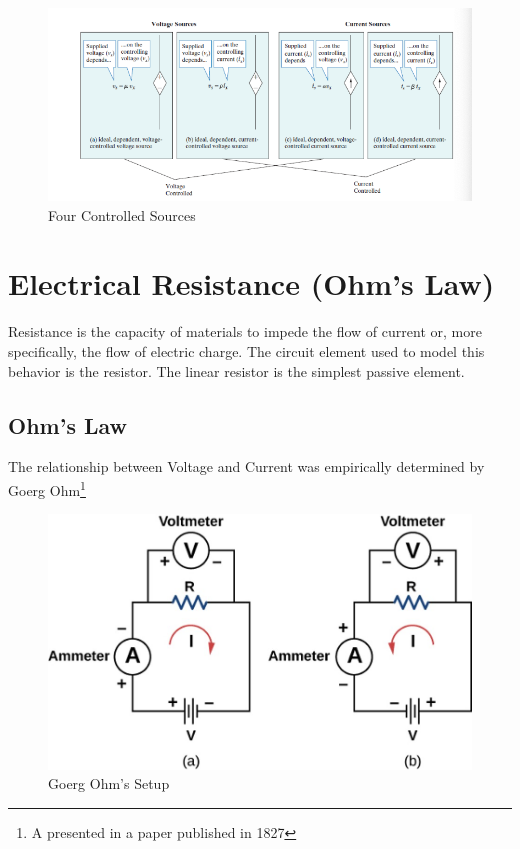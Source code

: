 \documentclass[14pt]{memoir}
\begin{document}
\begin{figure}[h]
\begin{center}
\includegraphics[scale=0.60]{fig/fig02_02.png}
\caption{Four Controlled Sources}
\label{fig:f02_02}
\end{center}
\end{figure}

\section{Electrical Resistance (Ohm's Law)}
Resistance is the capacity of materials to impede the flow of current or, more specifically, the flow of electric charge. The circuit element used to model this behavior is the resistor. The linear resistor is the simplest passive element.

\subsection{Ohm's Law}
The relationship between Voltage and Current was empirically determined by Goerg Ohm\footnote{A presented in a paper published in 1827}

\begin{figure}[H]
\begin{center}
\includegraphics[scale=0.50]{fig/fig_09_19.jpg}
\caption{Goerg Ohm's Setup}
\label{fig:09_19}
\end{center}
\end{figure}
\end{document}
